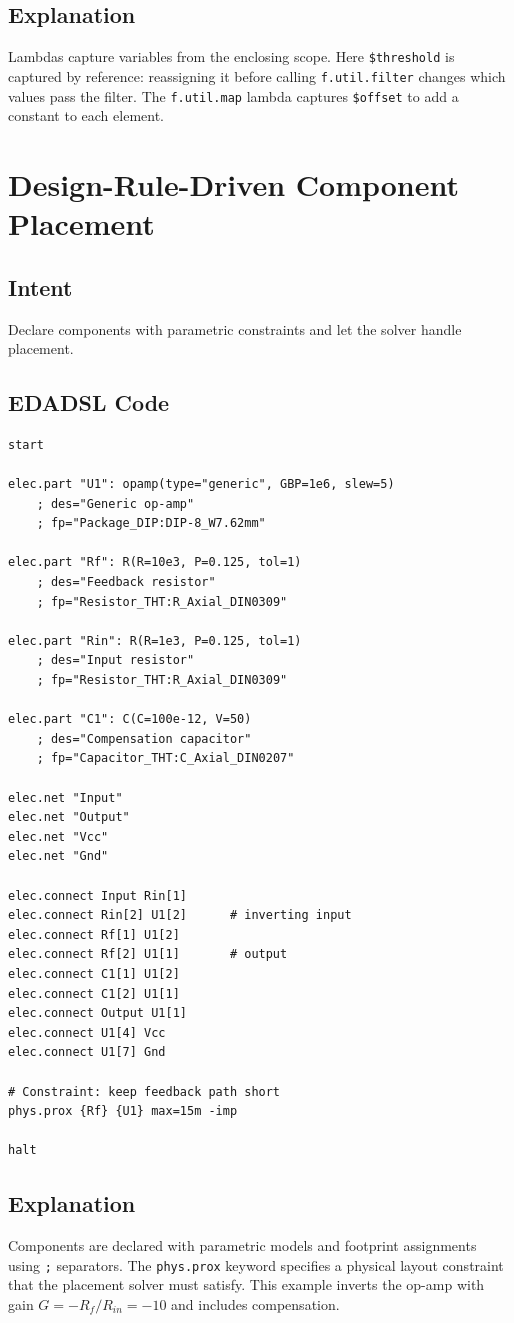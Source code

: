 \subsection{Explanation}
Lambdas capture variables from the enclosing scope. Here \texttt{\$threshold} is captured by reference: reassigning it before calling \texttt{f.util.filter} changes which values pass the filter. The \texttt{f.util.map} lambda captures \texttt{\$offset} to add a constant to each element.

\section{Design-Rule-Driven Component Placement}
\subsection{Intent}
Declare components with parametric constraints and let the solver handle placement.

\subsection{EDADSL Code}
\begin{verbatim}
start

elec.part "U1": opamp(type="generic", GBP=1e6, slew=5)
    ; des="Generic op-amp"
    ; fp="Package_DIP:DIP-8_W7.62mm"

elec.part "Rf": R(R=10e3, P=0.125, tol=1)
    ; des="Feedback resistor"
    ; fp="Resistor_THT:R_Axial_DIN0309"

elec.part "Rin": R(R=1e3, P=0.125, tol=1)
    ; des="Input resistor"
    ; fp="Resistor_THT:R_Axial_DIN0309"

elec.part "C1": C(C=100e-12, V=50)
    ; des="Compensation capacitor"
    ; fp="Capacitor_THT:C_Axial_DIN0207"

elec.net "Input"
elec.net "Output"
elec.net "Vcc"
elec.net "Gnd"

elec.connect Input Rin[1]
elec.connect Rin[2] U1[2]      # inverting input
elec.connect Rf[1] U1[2]
elec.connect Rf[2] U1[1]       # output
elec.connect C1[1] U1[2]
elec.connect C1[2] U1[1]
elec.connect Output U1[1]
elec.connect U1[4] Vcc
elec.connect U1[7] Gnd

# Constraint: keep feedback path short
phys.prox {Rf} {U1} max=15m -imp

halt
\end{verbatim}

\subsection{Explanation}
Components are declared with parametric models and footprint assignments using \texttt{;} separators. The \texttt{phys.prox} keyword specifies a physical layout constraint that the placement solver must satisfy. This example inverts the op-amp with gain $G = -R_f / R_{in} = -10$ and includes compensation.

